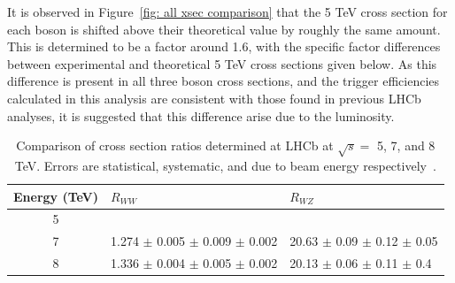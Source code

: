 \documentclass[a4paper]{article}
\begin{document}
It is observed in Figure~\ref{fig: all xsec comparison} that the 5 TeV cross section for each boson is shifted above their theoretical value by roughly the same amount. This is determined to be a factor around 1.6, with the specific factor differences between experimental and theoretical 5 TeV cross sections given below. As this difference is present in all three boson cross sections, and the trigger efficiencies calculated in this analysis are consistent with those found in previous LHCb analyses, it is suggested that this difference arise due to the luminosity.




\begin{table}[]
    \centering
    \begin{tabular}{c|ll}
        \hline
         Energy (TeV)   & $R_{WW}$ & $R_{WZ}$  \\
        \hline
         5              &   &   \\
         7              & 1.274 $\pm$ 0.005 $\pm$ 0.009 $\pm$ 0.002 & 20.63 $\pm$ 0.09 $\pm$ 0.12 $\pm$ 0.05  \\
         8              & 1.336 $\pm$ 0.004 $\pm$ 0.005 $\pm$ 0.002 & 20.13 $\pm$ 0.06 $\pm$ 0.11 $\pm$ 0.4   \\
         \hline
    \end{tabular}
    \caption{\small Comparison of cross section ratios determined at LHCb at $\sqrt{s} =$ 5, 7, and 8 TeV. Errors are statistical, systematic, and due to beam energy respectively~\cite{7TeV_Z_2015,8TeV_W+Z_2015}.}
    \label{tab: ratio comparison}
\end{table}

\end{document}
